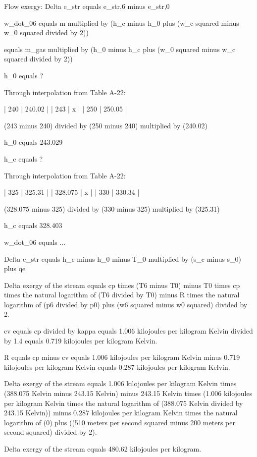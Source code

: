 Flow exergy:  
Delta e_str equals e_str,6 minus e_str,0  

w_dot_06 equals m multiplied by (h_c minus h_0 plus (w_c squared minus w_0 squared divided by 2))  

equals m_gas multiplied by (h_0 minus h_c plus (w_0 squared minus w_c squared divided by 2))  

h_0 equals ?  

Through interpolation from Table A-22:  

| 240 | 240.02 |  
| 243 | x |  
| 250 | 250.05 |  

(243 minus 240) divided by (250 minus 240) multiplied by (240.02)  

h_0 equals 243.029  

h_c equals ?  

Through interpolation from Table A-22:  

| 325 | 325.31 |  
| 328.075 | x |  
| 330 | 330.34 |  

(328.075 minus 325) divided by (330 minus 325) multiplied by (325.31)  

h_c equals 328.403  

w_dot_06 equals ...  

Delta e_str equals h_c minus h_0 minus T_0 multiplied by (s_c minus s_0) plus qe

Delta exergy of the stream equals cp times (T6 minus T0) minus T0 times cp times the natural logarithm of (T6 divided by T0) minus R times the natural logarithm of (p6 divided by p0) plus (w6 squared minus w0 squared) divided by 2.  

cv equals cp divided by kappa equals 1.006 kilojoules per kilogram Kelvin divided by 1.4 equals 0.719 kilojoules per kilogram Kelvin.  

R equals cp minus cv equals 1.006 kilojoules per kilogram Kelvin minus 0.719 kilojoules per kilogram Kelvin equals 0.287 kilojoules per kilogram Kelvin.  

Delta exergy of the stream equals 1.006 kilojoules per kilogram Kelvin times (388.075 Kelvin minus 243.15 Kelvin) minus 243.15 Kelvin times (1.006 kilojoules per kilogram Kelvin times the natural logarithm of (388.075 Kelvin divided by 243.15 Kelvin)) minus 0.287 kilojoules per kilogram Kelvin times the natural logarithm of (0) plus ((510 meters per second squared minus 200 meters per second squared) divided by 2).  

Delta exergy of the stream equals 480.62 kilojoules per kilogram.